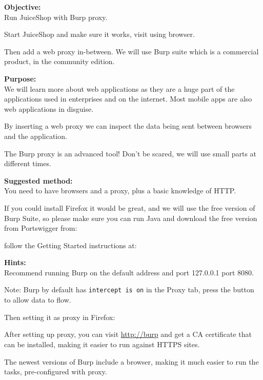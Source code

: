 \documentclass[a4paper,11pt,notitlepage]{report}
\begin{document}
{\bf Objective:}\\
Run JuiceShop with Burp proxy.

Start JuiceShop and make sure it works, visit using browser.

Then add a web proxy in-between. We will use Burp suite which is a commercial product, in the community edition.

{\bf Purpose:}\\
We will learn more about web applications as they are a huge part of the applications used in enterprises and on the internet. Most mobile apps are also web applications in disguise.

By inserting a web proxy we can inspect the data being sent between browsers and the application.

The Burp proxy is an advanced tool! Don't be scared, we will use small parts at different times.

{\bf Suggested method:}\\
You need to have browsers and a proxy, plus a basic knowledge of HTTP.

If you could install Firefox it would be great, and we will use the
free version of Burp Suite, so please make sure you can run Java and
download the free version from Portswigger from:



follow the Getting Started instructions at:\\


{\bf Hints:}\\
Recommend running Burp on the default address and port 127.0.0.1 port 8080.

Note: Burp by default has \verb+intercept is on+ in the Proxy tab, press the button to allow data to flow.



\eject
Then setting it as proxy in Firefox:


After setting up proxy, you can visit \url{http://burp} and get a CA certificate that can be installed, making it easier to run against HTTPS sites.

The newest versions of Burp include a browser, making it much easier to run the tasks, pre-configured with proxy.
\end{document}
